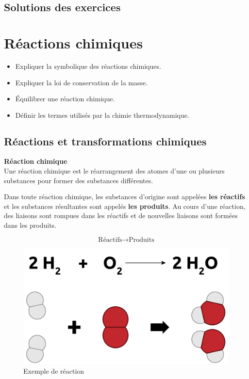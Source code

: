 \documentclass[
  11pt,
  a4paper,
  openany]{book}
\providecommand{\tightlist}{%
  \setlength{\itemsep}{0pt}\setlength{\parskip}{0pt}}
\begin{document}
\newpage

\section{Solutions des exercices} \shipoutAnswer

\chapter{Réactions chimiques}\label{ruxe9actions-chimiques}

\begin{objectives}

\begin{itemize}
\tightlist
\item
  Expliquer la symbolique des réactions chimiques.
\item
  Expliquer la loi de conservation de la masse.
\item
  Équilibrer une réaction chimique.
\item
  Définir les termes utilisés par la chimie thermodynamique.
\end{itemize}

\end{objectives}

\section{Réactions et transformations chimiques}\label{ruxe9actions-et-transformations-chimiques}

\begin{tcolorbox}
\textbf{Réaction chimique}\\
Une réaction chimique est le réarrangement des atomes d'une ou plusieurs substances pour former des substances différentes.

\end{tcolorbox}

Dans toute réaction chimique, les substances d'origine sont appelées \textbf{les réactifs} et les substances résultantes sont appelés \textbf{les produits}. Au cours d'une réaction, des liaisons sont rompues dans les réactifs et de nouvelles liaisons sont formées dans les produits.

\[ \text{Réactifs} \longrightarrow \text{Produits} \]

\begin{figure}

{\centering \includegraphics[width=0.45\linewidth]{images/reactions-1} 

}

\caption{Exemple de réaction}\label{fig:reactions-1}
\end{figure}
\end{document}
